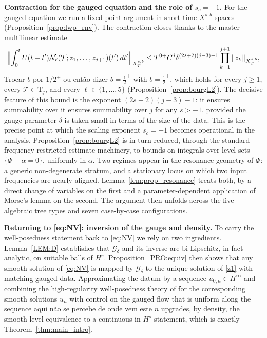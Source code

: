 \documentclass[a4paper,
11pt,  reqno]{amsart}
\newcommand{\blue}{\color{blue}}
\newcommand{\orange}{\color{orange}}
\newcommand{\5}{\textup{V}}
\theoremstyle{remark}
\newcommand{\TT}{\mathcal{T}}
\newcommand{\Tr}{\mathrm{T}}
\renewcommand{\l}{\ell}
\newcommand{\Gc}{\mathcal{G}}
\numberwithin{equation}{section}
\numberwithin{theorem}{section}
\newcommand{\Ncal}{\mathcal{N}}
\begin{document}
\medskip

\textbf{Contraction for the gauged equation and the role of $s_c=-1$.}
For the gauged equation we run a fixed-point argument in short-time $X^{s,b}$ spaces (Proposition~\ref{prop:lwp_rnv}). The contraction closes thanks to the master multilinear estimate
\[
\Bigl\|\int_0^t U(t-t')\Ncal_\l(\TT;z_1,\dots,z_{j+1})(t')\,dt'\Bigr\|_{X^{s,b}_T}
\le T^{0+} C^j \delta^{(2s+2)(j-3)-1}\prod_{k=1}^{j+1}\|z_k\|_{X^{s,b}_T},
\]{\blue Trocar $b$ por $1/2^+$ ou então dizer $b=\frac12^+$ }
{\orange with $b=\tfrac12^{+}$,} which holds for every $j\ge 1$, every $\TT\in\Tr_j$, and every $\l\in\{1,\dots,5\}$ (Proposition~\ref{prop:bourgL2}). The decisive feature of this bound is the exponent $(2s+2)(j-3)-1$: {\orange it ensures summability over} {\blue it ensures summability over }$j$ for any $s>-1$, provided the gauge parameter $\delta$ is taken small in terms of the size of the data. This is the precise point at which the scaling exponent $s_c=-1$ becomes operational in the analysis. Proposition~\ref{prop:bourgL2} is in turn reduced, through the standard frequency-restricted-estimate machinery, to bounds on integrals over level sets $\{\Phi-\alpha=0\}$, uniformly in $\alpha$. Two regimes appear in the resonance geometry of $\Phi$: a generic non-degenerate stratum, and a stationary locus on which two input frequencies are nearly aligned. Lemma~\ref{lem:prop_resonance} treats both, by a direct change of variables on the first and a parameter-dependent application of Morse's lemma on the second. The argument then unfolds across the five algebraic tree types and seven case-by-case configurations.

\medskip

\textbf{Returning to \eqref{eq:NV}: inversion of the gauge and density.}
To carry the well-posedness statement back to \eqref{eq:NV} we rely on two ingredients. Lemma~\ref{LEM:D} establishes that $\Gc_\delta$ and its inverse are bi-Lipschitz, in fact analytic, on suitable balls of $H^s$. Proposition~\ref{PRO:equiv} then shows that any smooth solution of \eqref{eq:NV} is mapped by $\Gc_\delta$ to the unique solution of \eqref{z1} with matching gauged data. {\orange Approximating the datum by a sequence $u_{0,n}\in H^\infty$ and combining the high-regularity well-posedness theory of \cite{angelopolous,kazeykinamunoz1,kazeykinamunoz2} for the corresponding smooth solutions $u_n$ with control on the gauged flow that is uniform along the sequence} {\blue aqui não se percebe de onde vem este $n$} upgrades, by density, the smooth-level equivalence to a continuous-in-$H^s$ statement, which is exactly Theorem~\ref{thm:main_intro}.
\end{document}
